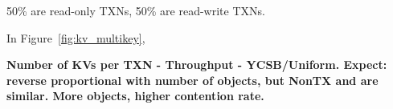 50\% are read-only TXNs, 50\% are read-write TXNs.

In Figure~\ref{fig:kv_multikey}, 

\textbf{Number of KVs per TXN - Throughput - YCSB/Uniform. Expect: reverse proportional with number of objects, but NonTX and \sys{} are similar. More objects, higher contention rate.}









